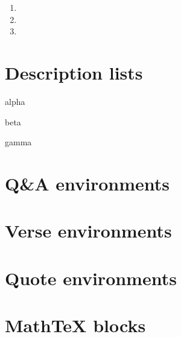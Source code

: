 \p{\lorem}
\begin{enumerate}
\item \p{\lorem}
\item \p{\lorem}
\item \p{\lorem}
\end{enumerate}
\p{\lorem}

\section{Description lists}

\p{\lorem}
\begin{description}
\item{alpha} \p{\lorem}
\item{beta} \p{\lorem}
\item{gamma} \p{\lorem}
\end{description}
\p{\lorem}

\section{Q&A environments}

\p{\lorem}
\begin{qanda}
    \p{\short}
    \p{\lorem}
    \p{\short}
    \p{\lorem}
    \p{\lorem}
\rquestion
    \p{\lorem}
\ranswer
    \p{\lorem}
\question
    \p{\lorem}
\answer
    \p{\lorem}
    \p{\lorem}
\rquestion
    \p{\lorem}
\ranswer
    \p{\lorem}
\end{qanda}
\p{\lorem}


\section{Verse environments}

\p{\lorem}
\begin{verse}
\p{\fox \br \fox \br \fox \br \fox}
\p{\fox \br \fox \br \fox \br \fox}
\p{\fox \br \fox \br \fox \br \fox}
\end{verse}
\p{\lorem}


\section{Quote environments}

\p{\lorem}
\begin{quote}
\p{\lorem}
\end{quote}
\p{\lorem}


\section{MathTeX blocks}

